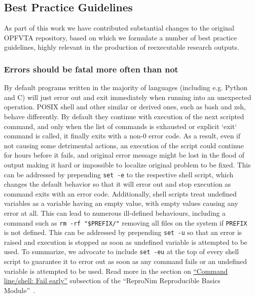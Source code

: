 \subsection{Best Practice Guidelines}

As part of this work we have contributed substantial changes to the original OPFVTA repository, based on which we formulate a number of best practice guidelines, highly relevant in the production of reexecutable research outputs.

\subsubsection{Errors should be fatal more often than not}

By default programs written in the majority of languages (including e.g. Python and C) will just error out and exit immediately when running into an unexpected operation.
POSIX shell and other similar or derived ones, such as bash and zsh,  behave differently.
By default they continue with execution of the next scripted command, and only when the list of commands is exhausted or explicit `exit` command is called, it finally exits with a non-0 error code.
As a result, even if not causing some detrimental actions, an execution of the script could continue for hours before it fails, and original error message might be lost in the flood of output making it hard or impossible to localize original problem to be fixed.
This can be addressed by prepending \texttt{set -e} to the respective shell script, which changes the default behavior so that it will error out and stop execution as command exits with an error code.
Additionally, shell scripts treat undefined variables as a variable having an empty value, with empty values causing any error at all.
This can lead to numerous ill-defined behaviours, including a command such as \texttt{rm -rf "\${PREFIX}/"} removing all files on the system if \texttt{PREFIX} is not defined.
This can be addressed by prepending \texttt{set -u} so that an error is raised and execution is stopped as soon as undefined variable is attempted to be used.
To summarize, we advocate to include \texttt{set -eu} at the top of every shell script to guarantee it to error out as soon as any command fails or an undefined variable is attempted to be used.
Read more in the section on \href{https://www.repronim.org/module-reproducible-basics/01-shell-basics/\#fail-early}{``Command line/shell: Fail early''} subsection of the ``ReproNim Reproducible Basics Module''~\cite{repronim:reprobasics}.

